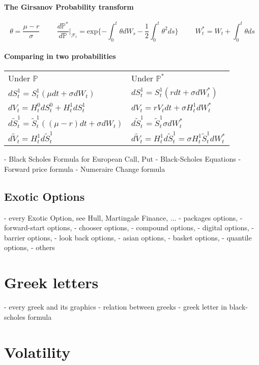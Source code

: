 \documentclass[a4paper,10pt]{article}
\begin{document}
\paragraph{The Girsanov Probability transform}
\[
\theta = \frac{\mu - r}{\sigma} 
\hspace{1cm} 
\frac{d\mathbb{P}^*}{d\mathbb{P}}|_{\mathcal{F}_t} = \text{exp}\{ -\int_0^t \theta dW_s - \frac{1}{2} \int_0^t \theta^2 ds \}
\hspace{1cm} 
W^*_t = W_t + \int_0^t \theta ds
\]
\paragraph{Comparing in two probabilities}
\begin{center}
\begin{tabular}{l|l}
 Under $\mathbb{P}$ & Under $\mathbb{P}^*$                                                      \\[6pt]
 $ dS^1_t = S^1_t( \mu dt + \sigma d W_t) $       &  $ dS^1_t = S^1_t( r dt + \sigma d W^*_t) $ \\[3pt]
 $ dV_t = H^0_t dS^0_t + H^1_t dS^1_t     $       &  $ dV_t = r V_t dt + \sigma H^1_t dW^*_t  $ \\[3pt]
 $ d\widetilde{S}^1_t = \widetilde{S}^1_t( (\mu-r)dt + \sigma dW_t ) $ & $d\widetilde{S}^1_t = \widetilde{S}^1_t \sigma dW^*_t  $ \\[3pt]
 $ d\widetilde{V}_t = H^1_t d\widetilde{S}^1_t $ & $d\widetilde{V}_t = H^1_t d\widetilde{S}^1_t =  \sigma H^1_t \widetilde{S}^1_t dW^*_t $
\end{tabular}
\end{center}


- Black Scholes Formula for European Call, Put
- Black-Scholes Equations
- Forward price formula
- Numeraire Change formula
\subsection{Exotic Options}
- every Exotic Option, see Hull, Martingale Finance, ...
- packages options, 
- forward-start options, 
- chooser options, 
- compound options, 
- digital options, 
- barrier options, 
- look back options, 
- asian options, 
- basket options, 
- quantile options, 
- others
\section{Greek letters}
- every greek and its graphics
- relation between greeks
- greek letter in black-scholes formula
\section{Volatility}
\end{document}
